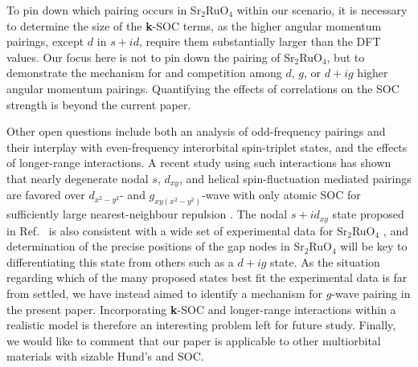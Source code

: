 \documentclass[%
reprint,
superscriptaddress,
 amsmath,amssymb,
 aps,
prb,
nobalancelastpage,
]{revtex4-2}
\begin{document}
To pin down which pairing occurs in Sr$_{2}$RuO$_{4}$ within our scenario, it is necessary to determine the size of the \textbf{k}-SOC terms, as the higher angular momentum pairings, except $d$ in $s+id$, require them substantially larger than the DFT values. Our focus here is not to pin down the pairing of Sr$_{2}$RuO$_{4}$, but to demonstrate the mechanism for and competition among $d$, $g$, or $d+ig$ higher angular momentum pairings.  Quantifying the effects of correlations on the SOC strength is beyond the current paper. 


Other open questions include both an analysis of odd-frequency pairings and their interplay with even-frequency interorbital spin-triplet states, and the effects of longer-range interactions. A recent study using such interactions has shown that nearly degenerate nodal $s$, $d_{xy}$, and helical spin-fluctuation mediated pairings are favored over $d_{x^2-y^2}$- and $g_{xy(x^2-y^2)}$-wave with only atomic SOC for sufficiently large nearest-neighbour repulsion \cite{romer2021}. The nodal $s+id_{xy}$ state proposed in Ref.~\cite{romer2021} is also consistent with a wide set of experimental data for Sr$_{2}$RuO$_{4}$ \cite{Luke1998Nature,Xia2006prl,Kidwingira2006science,Pustogow2019Nature,Ishida2019,Chronister2020,Steffens2019PRL,Ghosh2020,Benhabib2020,Grinenko2020}, and determination of the precise positions of the gap nodes in Sr$_{2}$RuO$_{4}$ will be key to differentiating this state from others such as a $d+ig$ state. As the situation regarding which of the many proposed states best fit the experimental data is far from settled, we have instead aimed to identify a mechanism for $g$-wave pairing in the present paper. Incorporating \textbf{k}-SOC and longer-range interactions within a realistic model is therefore an interesting problem left for future study. Finally, we would like to comment that our paper is applicable to other multiorbital materials with sizable Hund's and SOC.
\end{document}
